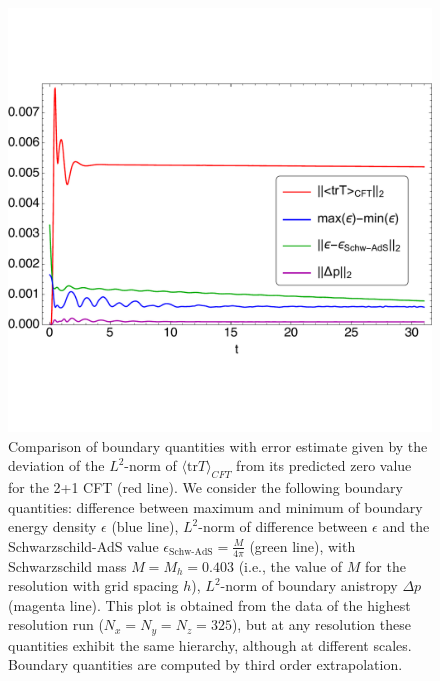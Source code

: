 \documentclass[a4paper,11pt]{article}
\numberwithin{equation}{section}
\begin{document}
\begin{figure}[!h]
        \centering
        \includegraphics[width=5.0in,clip=true]{plots/timeseries/L2-norm_trace_anisotropy_energydensityminusschw_maxminusminenergydensity/fullplotfillregttraceanisotropyenergydensityminusschwmaxminusminbdyenergydensity_L3.pdf}
\parbox{5.0in}{\caption{Comparison of boundary quantities with error estimate given by the deviation of the $L^2$-norm of $\langle \text{tr}T\rangle_{CFT}$ from its predicted zero value for the 2+1 CFT (red line). We consider the following boundary quantities: difference between maximum and minimum of boundary energy density $\epsilon$ (blue line), $L^2$-norm of difference between $\epsilon$ and the Schwarzschild-AdS value $\epsilon_{\text{Schw-AdS}}=\frac{M}{4\pi}$ (green line), with Schwarzschild mass $M=M_h=0.403$ (i.e., the value of $M$ for the resolution with grid spacing $h$), $L^2$-norm of boundary anistropy $\Delta p$ (magenta line). This plot is obtained from the data of the highest resolution run ($N_x=N_y=N_z=325$), but at any resolution these quantities exhibit the same hierarchy, although at different scales. Boundary quantities are computed by third order extrapolation.
        }\label{fig:fullplotfillregttraceanisotropyenergydensityminusschwmaxminusminbdyenergydensity.pdf}}
\end{figure}
\end{document}
